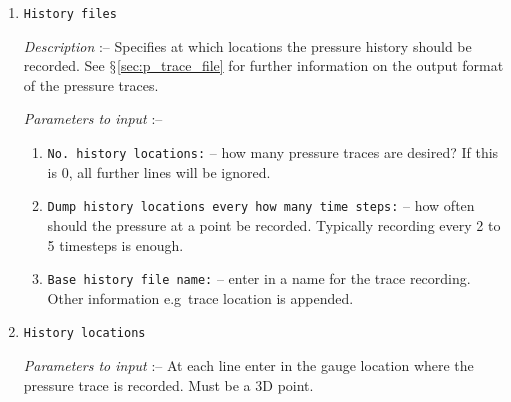 \documentclass[pdftex, 12pt, a4paper]{report}
\begin{document}
\begin{enumerate}

\item \verb'History files'

\emph{Description} :-- Specifies at which locations the pressure history should be recorded.  See $\mathsection$\ref{sec:p_trace_file}
for further information on the output format of the pressure traces. 

\emph{Parameters to input} :--
\begin{enumerate}
  \item \verb'No. history locations:' -- how many pressure traces are desired?  If this is 0, all further lines will be ignored.
  \item \verb'Dump history locations every how many time steps:' -- how often should the pressure at a point be recorded.  Typically recording every 2 to 5 timesteps is enough.
  \item \verb'Base history file name:' -- enter in a name for the trace recording.  Other information e.g\ trace location is appended.
\end{enumerate}

\item \verb'History locations'

\emph{Parameters to input} :-- At each line enter in the gauge location where the pressure trace is recorded.  Must be a 3D point. 

\end{enumerate}
\end{document}
